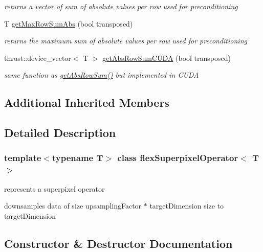 \begin{DoxyCompactItemize}
\begin{DoxyCompactList}\small\item\em returns a vector of sum of absolute values per row used for preconditioning \end{DoxyCompactList}\item 
T \hyperlink{classflex_superpixel_operator_a83c4978b05be05c45be7d2ea58e96b44}{get\+Max\+Row\+Sum\+Abs} (bool transposed)
\begin{DoxyCompactList}\small\item\em returns the maximum sum of absolute values per row used for preconditioning \end{DoxyCompactList}\item 
thrust\+::device\+\_\+vector$<$ T $>$ \hyperlink{classflex_superpixel_operator_ae2f878d68c4574a0d5f21ffd132afc63}{get\+Abs\+Row\+Sum\+C\+U\+DA} (bool transposed)
\begin{DoxyCompactList}\small\item\em same function as \hyperlink{classflex_superpixel_operator_afd3f55401eaa6fb3e8a62c7f83443a4d}{get\+Abs\+Row\+Sum()} but implemented in C\+U\+DA \end{DoxyCompactList}\end{DoxyCompactItemize}
\subsection*{Additional Inherited Members}


\subsection{Detailed Description}
\subsubsection*{template$<$typename T$>$\newline
class flex\+Superpixel\+Operator$<$ T $>$}

represents a superpixel operator 

downsamples data of size upsampling\+Factor $\ast$ target\+Dimension size to target\+Dimension 

\subsection{Constructor \& Destructor Documentation}
\mbox{\label{classflex_superpixel_operator_a810ff259aed4c17eed5b6c731bb59b3b}} 
